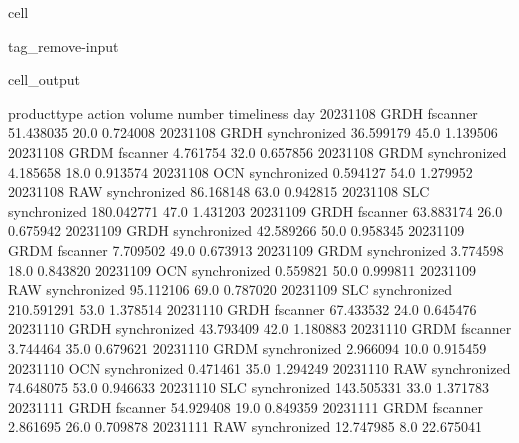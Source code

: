 \documentclass[letterpaper,10pt,english]{jupyterBook}
\begin{document}
\begin{sphinxuseclass}{cell}
\begin{sphinxuseclass}{tag_remove-input}\begin{sphinxVerbatimOutput}

\begin{sphinxuseclass}{cell_output}
\begin{sphinxVerbatim}[commandchars=\\\{\}]
           product\PYGZus{}type        action      volume  number  timeliness
day                                                                  
2023\PYGZhy{}11\PYGZhy{}08         GRDH      fscanner   51.438035    20.0    0.724008
2023\PYGZhy{}11\PYGZhy{}08         GRDH  synchronized   36.599179    45.0    1.139506
2023\PYGZhy{}11\PYGZhy{}08         GRDM      fscanner    4.761754    32.0    0.657856
2023\PYGZhy{}11\PYGZhy{}08         GRDM  synchronized    4.185658    18.0    0.913574
2023\PYGZhy{}11\PYGZhy{}08          OCN  synchronized    0.594127    54.0    1.279952
2023\PYGZhy{}11\PYGZhy{}08          RAW  synchronized   86.168148    63.0    0.942815
2023\PYGZhy{}11\PYGZhy{}08          SLC  synchronized  180.042771    47.0    1.431203
2023\PYGZhy{}11\PYGZhy{}09         GRDH      fscanner   63.883174    26.0    0.675942
2023\PYGZhy{}11\PYGZhy{}09         GRDH  synchronized   42.589266    50.0    0.958345
2023\PYGZhy{}11\PYGZhy{}09         GRDM      fscanner    7.709502    49.0    0.673913
2023\PYGZhy{}11\PYGZhy{}09         GRDM  synchronized    3.774598    18.0    0.843820
2023\PYGZhy{}11\PYGZhy{}09          OCN  synchronized    0.559821    50.0    0.999811
2023\PYGZhy{}11\PYGZhy{}09          RAW  synchronized   95.112106    69.0    0.787020
2023\PYGZhy{}11\PYGZhy{}09          SLC  synchronized  210.591291    53.0    1.378514
2023\PYGZhy{}11\PYGZhy{}10         GRDH      fscanner   67.433532    24.0    0.645476
2023\PYGZhy{}11\PYGZhy{}10         GRDH  synchronized   43.793409    42.0    1.180883
2023\PYGZhy{}11\PYGZhy{}10         GRDM      fscanner    3.744464    35.0    0.679621
2023\PYGZhy{}11\PYGZhy{}10         GRDM  synchronized    2.966094    10.0    0.915459
2023\PYGZhy{}11\PYGZhy{}10          OCN  synchronized    0.471461    35.0    1.294249
2023\PYGZhy{}11\PYGZhy{}10          RAW  synchronized   74.648075    53.0    0.946633
2023\PYGZhy{}11\PYGZhy{}10          SLC  synchronized  143.505331    33.0    1.371783
2023\PYGZhy{}11\PYGZhy{}11         GRDH      fscanner   54.929408    19.0    0.849359
2023\PYGZhy{}11\PYGZhy{}11         GRDM      fscanner    2.861695    26.0    0.709878
2023\PYGZhy{}11\PYGZhy{}11          RAW  synchronized   12.747985     8.0   22.675041

\end{sphinxVerbatim}
\end{sphinxuseclass}
\end{sphinxVerbatimOutput}
\end{sphinxuseclass}
\end{sphinxuseclass}
\end{document}
